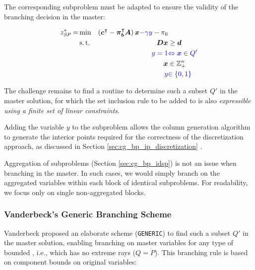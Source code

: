 The corresponding subproblem must be adapted to ensure the validity of the branching decision in the master:

\begin{equation}\label{eq:cg_bp_branchmaster_pricingmod}
\begin{aligned}
z^*_\SP{} = &\min & \left( \vec{c}\transpose - \vec{\pi}_\vec{b}\transpose \mat{A} \right) \vec{x} {\color{blue} - \gamma y} - \pi_0 & \\
&\st & \mat{D} \vec{x} & \geq \vec{d} \\
&& {\color{blue} y = 1} & {\color{blue} \Leftrightarrow \vec{x} \in Q'} \\
&& \vec{x} & \in \mathbb{Z}_+^n \\
&& {\color{blue} y} & {\color{blue} \in \{0, 1\}}
\end{aligned}
\end{equation}

The challenge remains to find a routine to determine such a subset $Q'$ in the master solution, for which the set inclusion rule to be added to \SP{} is also \textit{expressible using a finite set of linear constraints}.

\begin{note}
Adding the variable $y$ to the subproblem allows the column generation algorithm to generate the interior points required for the correctness of the discretization approach, as discussed in Section \ref{sec:cg_bp_ip_discretization} \cite{vanderbeck1996exact}.
\end{note}

\begin{note}
Aggregation of subproblems (Section \ref{sec:cg_bp_idsp}) is not an issue when branching in the master. In such cases, we would simply branch on the aggregated variables within each block of identical subproblems. For readability, we focus only on single non-aggregated blocks.
\end{note}

\subsubsection{Vanderbeck's Generic Branching Scheme}\label{sec:cg_bp_bp_branching_generic}
Vanderbeck proposed an elaborate scheme (\texttt{GENERIC}) \cite{vanderbeck2010reformulation,vanderbeck1996exact} to find such a subset $Q'$ in the master solution, enabling branching on master variables for any type of bounded \IP{}, i.e., which has no extreme rays ($Q = \ddot{P}$). This branching rule is based on component bounds on original variables:


